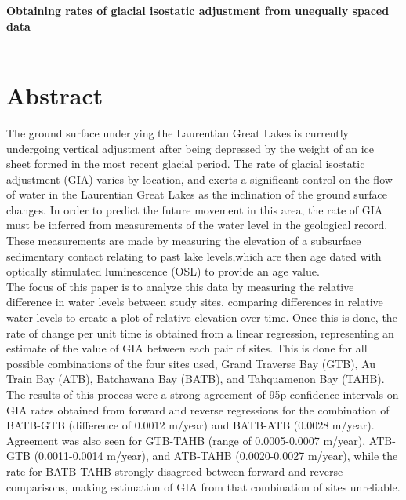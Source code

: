 
\begin{Large}
\textbf{{Obtaining rates of glacial isostatic adjustment from unequally spaced data\\ \\}}
\end{Large}

\section{Abstract}

The ground surface underlying the Laurentian Great Lakes is currently undergoing vertical adjustment
 after being depressed by the weight of an ice sheet formed in the most recent glacial period.
 The rate of glacial isostatic adjustment (GIA) varies by location, and exerts a significant control on the flow of water
 in the Laurentian Great Lakes as the inclination of the ground surface changes. In order to predict the
 future movement in this area, the rate of GIA must be
 inferred from measurements of the water level in the geological record. These measurements are
 made by measuring the elevation of a subsurface sedimentary contact relating to
 past lake levels,which are then age dated with optically stimulated luminescence
 (OSL) to provide an age value.\\
 
 The focus of this paper is to analyze this data by measuring the relative difference in water levels
 between study sites, comparing differences in relative water levels to create a
 plot of relative elevation over time. Once this is done, the rate of change per unit
 time is obtained from a linear regression, representing an estimate of the value
 of GIA between each pair of sites. This is done for
 all possible combinations of the four sites used, 
 Grand Traverse Bay (GTB), Au Train Bay (ATB), Batchawana Bay (BATB), and Tahquamenon Bay (TAHB).\\
 
 The results of this process were a strong agreement of 95p confidence intervals on GIA rates obtained from
 forward and reverse regressions for the combination of BATB-GTB (difference of 0.0012 m/year) and
 BATB-ATB (0.0028 m/year). Agreement was also seen for GTB-TAHB (range of 0.0005-0.0007 m/year),
 ATB-GTB (0.0011-0.0014 m/year), and ATB-TAHB (0.0020-0.0027 m/year), while the rate for BATB-TAHB
 strongly disagreed between forward and reverse comparisons, making estimation of
 GIA from that combination of sites unreliable.
 
